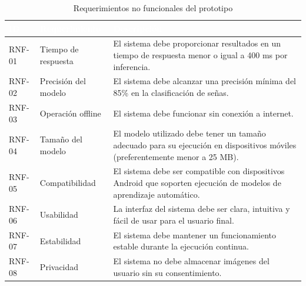 	{
		
		\small
		\renewcommand{\arraystretch}{1.18}
		
		\begin{table}[H]
			\centering
			\caption{Requerimientos no funcionales del prototipo}
			\label{tab:rnf}
			
			\begin{tabular}{
					!{\vrule width 0.6pt}
					>{\centering\arraybackslash}p{2cm}
					!{\vrule width 0.6pt}
					>{\centering\arraybackslash}p{5cm}
					!{\vrule width 0.6pt}
					>{\centering\arraybackslash}p{7cm}
					!{\vrule width 0.6pt}
				}
				
				\hline
				
				\textcolor{white}{\textbf{ID}} &
				\textcolor{white}{\textbf{Requerimiento}} &
				\textcolor{white}{\textbf{Descripción}} \\
				
				\hline
				
				RNF-01 &
				Tiempo de respuesta &
				El sistema debe proporcionar resultados en un tiempo de respuesta menor o igual a 400 ms por inferencia. \\
				
				\hline
				
				RNF-02 &
				Precisión del modelo &
				El sistema debe alcanzar una precisión mínima del 85\% en la clasificación de señas. \\
				
				\hline
				
				RNF-03 &
				Operación offline &
				El sistema debe funcionar sin conexión a internet. \\
				
				\hline
				
				RNF-04 &
				Tamaño del modelo &
				El modelo utilizado debe tener un tamaño adecuado para su ejecución en dispositivos móviles (preferentemente menor a 25 MB). \\
				
				\hline
				
				RNF-05 &
				Compatibilidad &
				El sistema debe ser compatible con dispositivos Android que soporten ejecución de modelos de aprendizaje automático. \\
				
				\hline
				
				RNF-06 &
				Usabilidad &
				La interfaz del sistema debe ser clara, intuitiva y fácil de usar para el usuario final. \\
				
				\hline
				
				RNF-07 &
				Estabilidad &
				El sistema debe mantener un funcionamiento estable durante la ejecución continua. \\
				
				\hline
				
				RNF-08 &
				Privacidad &
				El sistema no debe almacenar imágenes del usuario sin su consentimiento. \\
				
				\hline
				
			\end{tabular}
		\end{table}
	}
	
